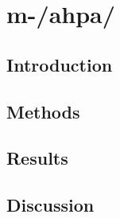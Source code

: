\section{{\color{red}m-/ahpa/}}
\subsection{Introduction}
\subsection{Methods}
\subsection{Results}
\subsection{Discussion}





